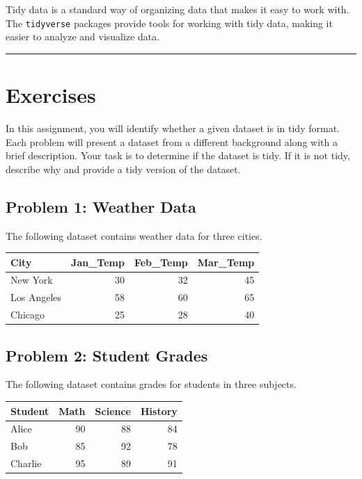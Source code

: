 \documentclass[
  letterpaper,
  DIV=11,
  numbers=noendperiod]{scrreprt}
\begin{document}

Tidy data is a standard way of organizing data that makes it easy to
work with. The \texttt{tidyverse} packages provide tools for working
with tidy data, making it easier to analyze and visualize data.

\begin{center}\rule{0.5\linewidth}{0.5pt}\end{center}

\section*{Exercises}\label{exercises-5}


In this assignment, you will identify whether a given dataset is in tidy
format. Each problem will present a dataset from a different background
along with a brief description. Your task is to determine if the dataset
is tidy. If it is not tidy, describe why and provide a tidy version of
the dataset.

\subsection*{Problem 1: Weather Data}\label{problem-1-weather-data}

The following dataset contains weather data for three cities.

\begin{tabular}{l|r|r|r}
\hline
City & Jan\_Temp & Feb\_Temp & Mar\_Temp\\
\hline
New York & 30 & 32 & 45\\
\hline
Los Angeles & 58 & 60 & 65\\
\hline
Chicago & 25 & 28 & 40\\
\hline
\end{tabular}

\subsection*{Problem 2: Student Grades}\label{problem-2-student-grades}

The following dataset contains grades for students in three subjects.

\begin{table}
\centering
\begin{tabular}{l|r|r|r}
\hline
Student & Math & Science & History\\
\hline
Alice & 90 & 88 & 84\\
\hline
Bob & 85 & 92 & 78\\
\hline
Charlie & 95 & 89 & 91\\
\hline
\end{tabular}
\end{table}
\end{document}
